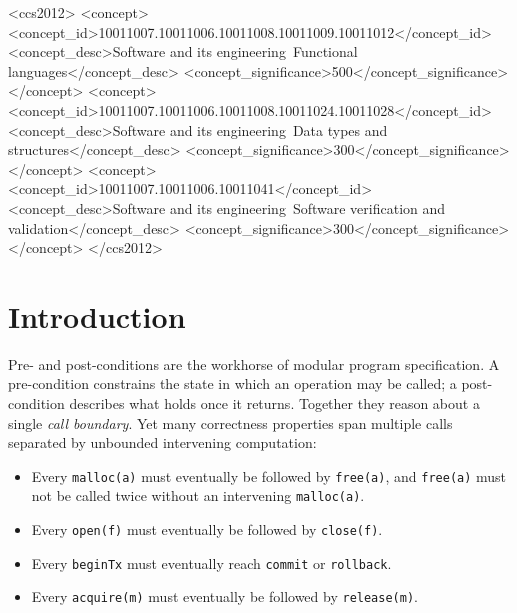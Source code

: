 \documentclass[acmsmall,screen]{acmart}
\begin{document}
\begin{CCSXML}
<ccs2012>
  <concept>
    <concept_id>10011007.10011006.10011008.10011009.10011012</concept_id>
    <concept_desc>Software and its engineering~Functional languages</concept_desc>
    <concept_significance>500</concept_significance>
  </concept>
  <concept>
    <concept_id>10011007.10011006.10011008.10011024.10011028</concept_id>
    <concept_desc>Software and its engineering~Data types and structures</concept_desc>
    <concept_significance>300</concept_significance>
  </concept>
  <concept>
    <concept_id>10011007.10011006.10011041</concept_id>
    <concept_desc>Software and its engineering~Software verification and validation</concept_desc>
    <concept_significance>300</concept_significance>
  </concept>
</ccs2012>
\end{CCSXML}

\maketitle

\section{Introduction}
\label{sec:intro}

Pre- and post-conditions are the workhorse of modular program specification.
A pre-condition constrains the state in which an operation may be called;
a post-condition describes what holds once it returns. Together they reason
about a single \emph{call boundary}. Yet many correctness properties span
multiple calls separated by unbounded intervening computation:

\begin{itemize}
  \item Every \lstinline{malloc(a)} must eventually be followed by
        \lstinline{free(a)}, and \lstinline{free(a)} must not be called twice
        without an intervening \lstinline{malloc(a)}.
  \item Every \lstinline{open(f)} must eventually be followed by
        \lstinline{close(f)}.
  \item Every \lstinline{beginTx} must eventually reach
        \lstinline{commit} or \lstinline{rollback}.
  \item Every \lstinline{acquire(m)} must eventually be followed by
        \lstinline{release(m)}.
\end{itemize}
\end{document}
